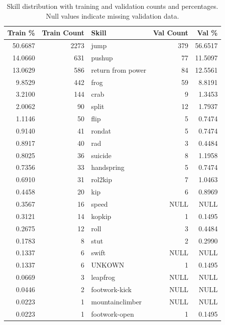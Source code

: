\begin{table}[h!]
    \centering
    \begin{tabular}{|r|r|l|r|r|}
        \hline
        \textbf{Train \%} & \textbf{Train Count} & \textbf{Skill} & \textbf{Val Count} & \textbf{Val \%} \\
        \hline
        50.6687 & 2273 & jump & 379 & 56.6517 \\
        14.0660 & 631 & pushup & 77 & 11.5097 \\
        13.0629 & 586 & return from power & 84 & 12.5561 \\
        9.8529 & 442 & frog & 59 & 8.8191 \\
        3.2100 & 144 & crab & 9 & 1.3453 \\
        2.0062 & 90 & split & 12 & 1.7937 \\
        1.1146 & 50 & flip & 5 & 0.7474 \\
        0.9140 & 41 & rondat & 5 & 0.7474 \\
        0.8917 & 40 & rad & 3 & 0.4484 \\
        0.8025 & 36 & suicide & 8 & 1.1958 \\
        0.7356 & 33 & handspring & 5 & 0.7474 \\
        0.6910 & 31 & rol2kip & 7 & 1.0463 \\
        0.4458 & 20 & kip & 6 & 0.8969 \\
        0.3567 & 16 & speed & NULL & NULL \\
        0.3121 & 14 & kopkip & 1 & 0.1495 \\
        0.2675 & 12 & roll & 3 & 0.4484 \\
        0.1783 & 8 & stut & 2 & 0.2990 \\
        0.1337 & 6 & swift & NULL & NULL \\
        0.1337 & 6 & UNKOWN & 1 & 0.1495 \\
        0.0669 & 3 & leapfrog & NULL & NULL \\
        0.0446 & 2 & footwork-kick & NULL & NULL \\
        0.0223 & 1 & mountainclimber & NULL & NULL \\
        0.0223 & 1 & footwork-open & 1 & 0.1495 \\
        \hline
    \end{tabular}
    \caption{Skill distribution with training and validation counts and percentages. Null values indicate missing validation data.}
    \label{tab:skill_distribution_full_with_nulls}
\end{table}


